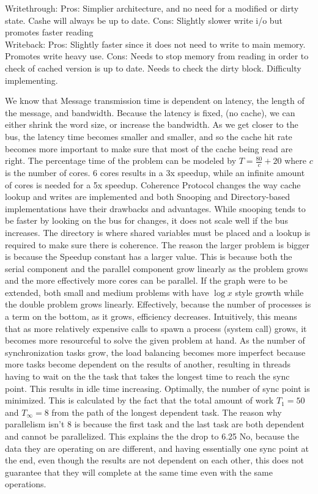 \documentclass{hw121}              %
\begin{document}
	\hwproblem
	Writethrough: Pros: Simplier architecture, and no need for a modified or dirty state. Cashe will always be up to date. Cons: Slightly slower write i/o but promotes faster reading \\ Writeback: Pros:  Slightly faster since it does not need to write to main memory. Promotes write heavy use. Cons: Needs to stop memory from reading in order to check of cached version is up to date. Needs to check the dirty block. Difficulty implementing.
	
	\hwproblem
		We know that Message transmission time is dependent on latency, the length of the message, and bandwidth. Because the latency is fixed, (no cache), we can either shrink the word size, or increase the bandwidth.
	\hwproblem
	As we get closer to the bus, the latency time becomes smaller and smaller, and so the cache hit rate becomes more important to make sure that most of the cache being read are right.
	\hwproblem
		The percentage time of the problem can be modeled by $T = \frac{80}{c} + 20$ where $c$ is the number of cores. 6 cores results in a 3x speedup, while an infinite amount of cores is needed for a 5x speedup.
	\hwproblem
	Coherence Protocol changes the way cache lookup and writes are implemented and both Snooping and Directory-based implementations have their drawbacks and advantages. While snooping tends to be faster by looking on the bus for changes, it does not scale well if the bus increases. The directory is where shared variables must be placed and a lookup is required to make sure there is coherence.
	\hwproblem
	The reason the larger problem is bigger is because the Speedup constant has a larger value. This is because both the serial component and the parallel component grow linearly as the problem grows and the more effectively more cores can be parallel. If the graph were to be extended, both small and medium problems with have $\log x$ style growth while the double problem grows linearly.
	\hwproblem
	Effectively, because the number of processes is a term on the bottom, as it grows, efficiency decreases. Intuitively, this means that as more relatively expensive calls to spawn a process (system call) grows, it becomes more resourceful to solve the given problem at hand.
	\hwproblem
	As the number of synchronization tasks grow, the load balancing becomes more imperfect because more tasks become dependent on the results of another, resulting in threads having to wait on the the task that takes the longest time to reach the sync point. This results in idle time increasing. Optimally, the number of sync point is minimized.
	\hwproblem
	This is calculated by the fact that the total amount of work $T_{1} = 50$ and $T_{\infty} = 8$ from the path of the longest dependent task. The reason why parallelism isn't 8 is because the first task and the last task are both dependent and cannot be parallelized.  This explains the the drop to 6.25
	\hwproblem
	No, because the data they are operating on are different, and having essentially one sync point at the end, even though the results are not dependent on each other, this does not guarantee that they will complete at the same time even with the same operations.
	
\end{document}
